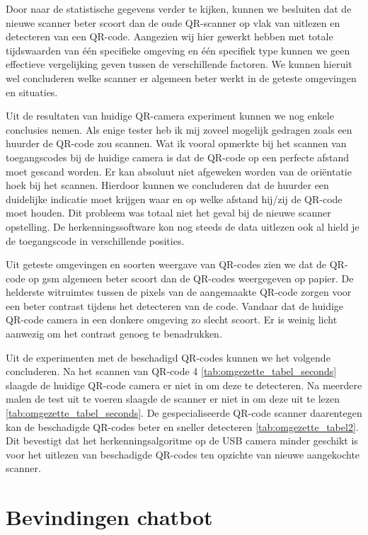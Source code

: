     
Door naar de statistische gegevens verder te kijken, kunnen we besluiten dat de nieuwe scanner beter scoort dan de oude QR-scanner op vlak van uitlezen en detecteren van een QR-code. Aangezien wij hier gewerkt hebben met totale tijdswaarden van één specifieke omgeving en één specifiek type kunnen we geen effectieve vergelijking geven tussen de verschillende factoren. We kunnen hieruit wel concluderen welke scanner er algemeen beter werkt in de geteste omgevingen en situaties.

Uit de resultaten van huidige QR-camera experiment kunnen we nog enkele conclusies nemen. Als enige tester heb ik mij zoveel mogelijk gedragen zoals een huurder de QR-code zou scannen. Wat ik vooral opmerkte bij het scannen van toegangscodes bij de huidige camera is dat de QR-code op een perfecte afstand moet gescand worden. Er kan absoluut niet afgeweken worden van de oriëntatie hoek bij het scannen. Hierdoor kunnen we concluderen dat de huurder een duidelijke indicatie moet krijgen waar en op welke afstand hij/zij de QR-code moet houden. Dit probleem was totaal niet het geval bij de nieuwe scanner opstelling. De herkenningssoftware kon nog steeds de data uitlezen ook al hield je de toegangscode in verschillende posities.

Uit geteste omgevingen en soorten weergave van QR-codes zien we dat de QR-code op gsm algemeen beter scoort dan de QR-codes weergegeven op papier. De helderste witruimtes tussen de pixels van de aangemaakte QR-code zorgen voor een beter contrast tijdens het detecteren van de code. Vandaar dat de huidige QR-code camera in een donkere omgeving zo slecht scoort. Er is weinig licht aanwezig om het contrast genoeg te benadrukken. 

Uit de experimenten met de beschadigd QR-codes kunnen we het volgende concluderen. Na het scannen van QR-code 4 \ref{tab:omgezette_tabel_seconds} slaagde de huidige QR-code camera er niet in om deze te detecteren. Na meerdere malen de test uit te voeren slaagde de scanner er niet in om deze uit te lezen \ref{tab:omgezette_tabel_seconds}. De gespecialiseerde QR-code scanner daarentegen kan de beschadigde QR-codes beter en sneller detecteren \ref{tab:omgezette_tabel2}. Dit bevestigt dat het herkenningsalgoritme op de USB camera minder geschikt is voor het uitlezen van beschadigde QR-codes ten opzichte van nieuwe aangekochte scanner.
\newpage
\section{Bevindingen  chatbot}
\label{sec:resultatenChatbot}

